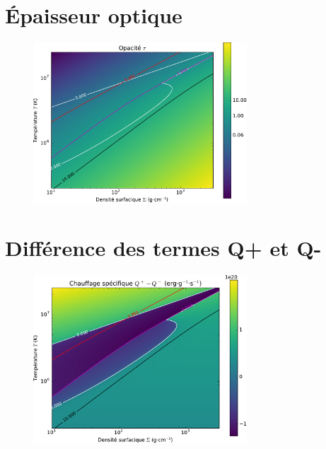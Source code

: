 \documentclass[french]{beamer}
\begin{document}
\section{Épaisseur optique}
\begin{frame}

   \begin{figure}[htb!]
      \includegraphics[width=8cm]{figures/tau_map.pdf}
   \end{figure}
\end{frame}

\section{Différence des termes Q+ et Q-}
\begin{frame}

   \begin{figure}[htb!]
      \includegraphics[width=8cm]{figures/Qmap.pdf}
   \end{figure}
\end{frame}

\end{document}
